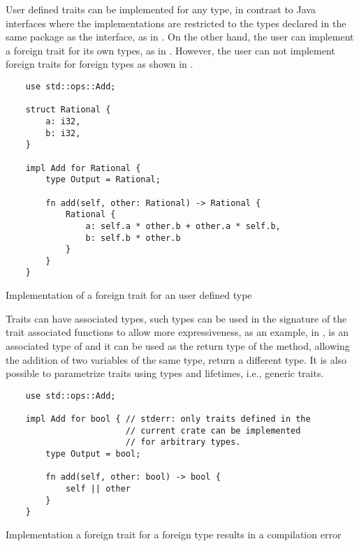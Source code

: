 User defined traits can be implemented for any type, in contrast to Java
interfaces where the implementations are restricted to the types declared in the
same package as the interface, as in . On the other
hand, the user can implement a foreign trait for its own types, as in
. However, the user can not implement foreign traits
for foreign types as shown in .

\begin{listing}[h]
	\begin{verbatim}
    use std::ops::Add;

    struct Rational {
        a: i32,
        b: i32,
    }

    impl Add for Rational {
        type Output = Rational;
        
        fn add(self, other: Rational) -> Rational {
            Rational {
                a: self.a * other.b + other.a * self.b,
                b: self.b * other.b
            }
        }
    }
    \end{verbatim}
  \caption{Implementation of a foreign trait for an user defined type}
  \label{lst:foreign_trait_impl}
\end{listing}

Traits can have associated types, such types can be used in the signature of the
trait associated functions to allow more expressiveness, as an example, in
,  is an associated type of
 and it can be used as the return type of the  method,
allowing the addition of two variables of the same type, return a different
type. It is also possible to parametrize traits using types and lifetimes, i.e.,
generic traits.

\begin{listing}[h]
	\begin{verbatim}
    use std::ops::Add;

    impl Add for bool { // stderr: only traits defined in the
                        // current crate can be implemented 
                        // for arbitrary types.
        type Output = bool;
        
        fn add(self, other: bool) -> bool {
            self || other
        }
    }
    \end{verbatim}
  \caption{Implementation a foreign trait for a foreign type results in a compilation error}
  \label{lst:foreign_trait_foreign_impl}
\end{listing}

